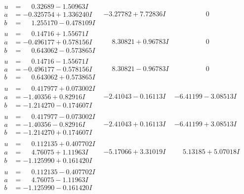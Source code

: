 \documentclass[1p]{elsarticle_modified}
\theoremstyle{definition}
\begin{document}
$$\begin{array}{c|c|c}
\begin{aligned}
u &= \phantom{-}0.32689 - 1.50963 I \\
a &= -0.325754 + 1.336240 I \\
b &= \phantom{-}1.255170 - 0.478109 I\end{aligned}
 & -3.27782 + 7.72836 I & \phantom{-0.000000 } 0 \\ \hline\begin{aligned}
u &= \phantom{-}0.14716 + 1.55671 I \\
a &= -0.496177 + 0.578156 I \\
b &= \phantom{-}0.643062 - 0.573865 I\end{aligned}
 & \phantom{-}8.30821 + 0.96783 I & \phantom{-0.000000 } 0 \\ \hline\begin{aligned}
u &= \phantom{-}0.14716 - 1.55671 I \\
a &= -0.496177 - 0.578156 I \\
b &= \phantom{-}0.643062 + 0.573865 I\end{aligned}
 & \phantom{-}8.30821 - 0.96783 I & \phantom{-0.000000 } 0 \\ \hline\begin{aligned}
u &= \phantom{-}0.417977 + 0.073002 I \\
a &= -1.40356 + 0.82916 I \\
b &= -1.214270 - 0.174607 I\end{aligned}
 & -2.41043 - 0.16113 I & -6.41199 - 3.08513 I \\ \hline\begin{aligned}
u &= \phantom{-}0.417977 - 0.073002 I \\
a &= -1.40356 - 0.82916 I \\
b &= -1.214270 + 0.174607 I\end{aligned}
 & -2.41043 + 0.16113 I & -6.41199 + 3.08513 I \\ \hline\begin{aligned}
u &= \phantom{-}0.112135 + 0.407702 I \\
a &= \phantom{-}4.76075 + 1.11963 I \\
b &= -1.125990 + 0.161420 I\end{aligned}
 & -5.17066 + 3.31019 I & \phantom{-}5.13185 + 5.07018 I \\ \hline\begin{aligned}
u &= \phantom{-}0.112135 - 0.407702 I \\
a &= \phantom{-}4.76075 - 1.11963 I \\
b &= -1.125990 - 0.161420 I\end{aligned}

\end{array}$$
\end{document}

